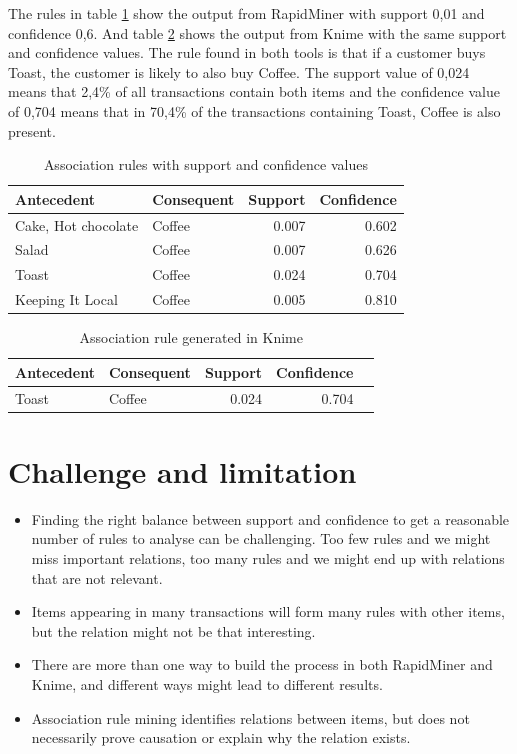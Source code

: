 The rules in table \ref{tab:rapidminer_rules} show the output from RapidMiner with
support 0,01 and confidence 0,6. And table \ref{tab:knime_rule} shows the output from Knime with
the same support and confidence values. The rule found in both tools is that if a customer buys
Toast, the customer is likely to also buy Coffee. The support value of 0,024 means that 2,4\%
of all transactions contain both items and the confidence value of 0,704 means that in 70,4\%
of the transactions containing Toast, Coffee is also present.

\begin{table}[H]
\centering
\caption{Association rules with support and confidence values}
\begin{tabular}{l l r r}
\hline
\textbf{Antecedent} & \textbf{Consequent} & \textbf{Support} & \textbf{Confidence} \\
\hline
Cake, Hot chocolate & Coffee & 0.007 & 0.602 \\
Salad               & Coffee & 0.007 & 0.626 \\
Toast               & Coffee & 0.024 & 0.704 \\
Keeping It Local    & Coffee & 0.005 & 0.810 \\
\hline
\end{tabular}
\label{tab:rapidminer_rules}
\end{table}

\begin{table}[H]
\centering
\caption{Association rule generated in Knime}
\begin{tabular}{l l r r r}
\hline
\textbf{Antecedent} & \textbf{Consequent} & \textbf{Support} & \textbf{Confidence} \\
\hline
Toast & Coffee & 0.024 & 0.704 \\
\hline
\end{tabular}
\label{tab:knime_rule}
\end{table}

\section{Challenge and limitation}

\begin{itemize}
    \item Finding the right balance between support and confidence to get a reasonable number of rules
    to analyse can be challenging. Too few rules and we might miss important relations, too many rules
    and we might end up with relations that are not relevant.
    
    \item Items appearing in many transactions will form many rules with other items, but the relation
    might not be that interesting.
    
    \item There are more than one way to build the process in both RapidMiner and Knime, and
    different ways might lead to different results.

    \item Association rule mining identifies relations between items, but does not necessarily prove causation
    or explain why the relation exists.
\end{itemize}
